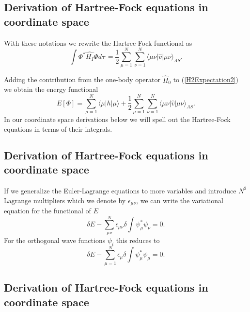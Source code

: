 \documentclass[%
twoside,                 %
final,                   %
10pt]{article}
\begin{document}
\subsection*{Derivation of Hartree-Fock equations in coordinate space}

\paragraph{}
With these notations we rewrite the Hartree-Fock functional as
\begin{equation}
  \int \Phi^*\hat{H_I}\Phi d\mathbf{\tau} 
  = \frac{1}{2}\sum_{\mu=1}^N\sum_{\nu=1}^N \langle \mu\nu|\hat{v}|\mu\nu\rangle_{AS}. \label{H2Expectation2}
\end{equation}

Adding the contribution from the one-body operator $\hat{H}_0$ to
(\ref{H2Expectation2}) we obtain the energy functional 
\begin{equation}
  E[\Phi] 
  = \sum_{\mu=1}^N \langle \mu | h | \mu \rangle +
  \frac{1}{2}\sum_{{\mu}=1}^N\sum_{{\nu}=1}^N \langle \mu\nu|\hat{v}|\mu\nu\rangle_{AS}. \label{FunctionalEPhi}
\end{equation}
In our coordinate space derivations below we will spell out the Hartree-Fock equations in terms of their integrals.




\subsection*{Derivation of Hartree-Fock equations in coordinate space}

\paragraph{}
If we generalize the Euler-Lagrange equations to more variables 
and introduce $N^2$ Lagrange multipliers which we denote by 
$\epsilon_{\mu\nu}$, we can write the variational equation for the functional of $E$
\[
  \delta E - \sum_{\mu\nu}^N \epsilon_{\mu\nu} \delta
  \int \psi_{\mu}^* \psi_{\nu} = 0.
\]
For the orthogonal wave functions $\psi_{i}$ this reduces to
\[
  \delta E - \sum_{\mu=1}^N \epsilon_{\mu} \delta
  \int \psi_{\mu}^* \psi_{\mu} = 0.
\]



\subsection*{Derivation of Hartree-Fock equations in coordinate space}
\end{document}
